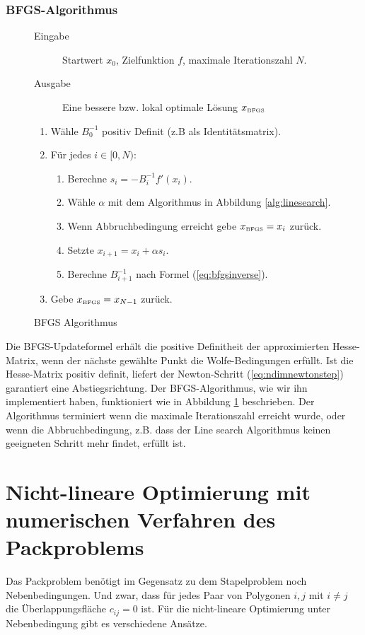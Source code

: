 \documentclass[runningheads,a4paper]{llncs}
\begin{document}
\subsubsection{BFGS-Algorithmus}
\begin{figure}[ht]
 \centering
 \begin{description}
 \item[Eingabe] Startwert $x_0$, Zielfunktion $f$, maximale Iterationszahl $N$.
 \item[Ausgabe] Eine bessere bzw. lokal optimale Lösung $x_{\text{\tiny{BFGS}}}$
 \end{description}
 \begin{enumerate}
 	\item Wähle $B_0^{-1}$ positiv Definit (z.B als Identitätsmatrix).
 	\item Für jedes $i \in [0,N)$:
 	\begin{enumerate}
 	\item Berechne $s_i = - B_i^{-1} f'(x_i)$.
 	\item Wähle $\alpha$ mit dem Algorithmus in Abbildung \ref{alg:linesearch}.
 	\item Wenn Abbruchbedingung erreicht gebe $x_{\text{\tiny{BFGS}}} = x_i$ zurück.
 	\item Setzte $x_{i+1} = x_i + \alpha s_i$.
 	\item Berechne $B_{i+1}^{-1}$ nach Formel (\ref{eq:bfgsinverse}).
 	\end{enumerate}
 	\item Gebe $x_{\text{\tiny{BFGS}}} = x_{N-1}$ zurück.
 \end{enumerate}
 \caption{BFGS Algorithmus}
 \label{alg:bfgs}
\end{figure}

Die BFGS-Updateformel erhält die positive Definitheit der approximierten Hesse-Matrix, wenn der nächste gewählte Punkt die Wolfe-Bedingungen erfüllt. Ist die Hesse-Matrix positiv definit, liefert der Newton-Schritt (\ref{eq:ndimnewtonstep}) garantiert eine Abstiegsrichtung. Der BFGS-Algorithmus, wie wir ihn implementiert haben, funktioniert wie in Abbildung \ref{alg:bfgs} beschrieben.
Der Algorithmus terminiert wenn die maximale Iterationszahl erreicht wurde, oder wenn die Abbruchbedingung, z.B. dass der Line search Algorithmus keinen geeigneten Schritt mehr findet, erfüllt ist.

\section{Nicht-lineare Optimierung mit numerischen Verfahren des Packproblems}
\label{sec:cons_nonlin_opt}
Das Packproblem benötigt im Gegensatz zu dem Stapelproblem noch Nebenbedingungen. Und zwar, dass für jedes Paar von Polygonen $i,j$ mit $i \neq j$ die Überlappungsfläche $c_{ij}=0$ ist. Für die nicht-lineare Optimierung unter Nebenbedingung gibt es verschiedene Ansätze.
\end{document}
